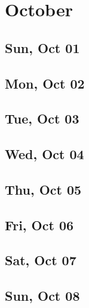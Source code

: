 \chapter{October}
	\section{Sun, Oct 01}
		
		
	\section{Mon, Oct 02}
		
		
	\section{Tue, Oct 03}
		
		
	\section{Wed, Oct 04}
		
		
	\section{Thu, Oct 05}
		
		
	\section{Fri, Oct 06}
		
		
	\section{Sat, Oct 07}
		
		
	\section{Sun, Oct 08}
		
		
